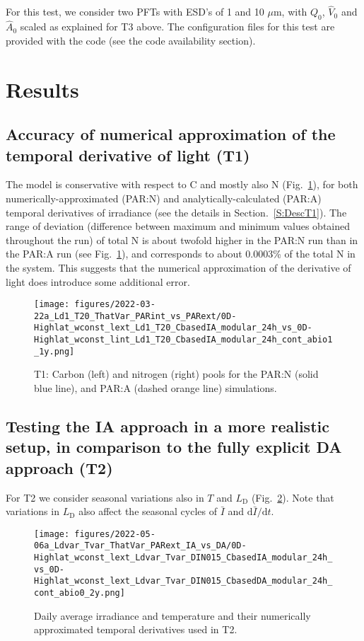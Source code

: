 \documentclass[gmd, manuscript]{copernicus}
\begin{document}
    For this test, we consider two PFTs with ESD's of 1 and 10 $\mu$m, with $Q_0$, $\hat{V}_0$ and $\hat{A}_0$ scaled as explained for T3 above. The configuration files for this test are provided with the code (see the code availability section).

\section{Results}

\subsection{Accuracy of numerical approximation of the temporal derivative of light (T1)}
The model is conservative with respect to C and mostly also N (Fig.~\ref{f.T1res}), for both numerically-approximated (PAR:N) and analytically-calculated (PAR:A) temporal derivatives of irradiance (see the details in Section.~\ref{S:DescT1}). The range of deviation (difference between maximum and minimum values obtained throughout the run) of total N is about twofold higher in the PAR:N run than in the PAR:A run (see Fig.~\ref{f.T1res}), and corresponds to about 0.0003\% of the total N in the system. This suggests that the numerical approximation of the derivative of light does introduce some additional error.

\begin{figure}[ht!]
\texttt{[image: figures/2022-03-22a\_Ld1\_T20\_ThatVar\_PARint\_vs\_PARext/0D-Highlat\_wconst\_lext\_Ld1\_T20\_CbasedIA\_modular\_24h\_vs\_0D-Highlat\_wconst\_lint\_Ld1\_T20\_CbasedIA\_modular\_24h\_cont\_abio1\_1y.png]}
\caption{T1: Carbon (left) and nitrogen (right) pools for the PAR:N (solid blue line), and PAR:A (dashed orange line) simulations.
\label{f.T1res}}
\end{figure}

\FloatBarrier%

\subsection{Testing the IA approach in a more realistic setup, in comparison to the fully explicit DA approach (T2)}

For T2 we consider seasonal variations also in $T$ and $L_{\text{D}}$ (Fig.~\ref{f.T2env}).  Note that variations in $L_{\text{D}}$ also affect the seasonal cycles of $\bar{I}$ and $\text{d}\bar{I}/\text{d}t$.

\begin{figure}[ht!]
  \texttt{[image: figures/2022-05-06a\_Ldvar\_Tvar\_ThatVar\_PARext\_IA\_vs\_DA/0D-Highlat\_wconst\_lext\_Ldvar\_Tvar\_DIN015\_CbasedIA\_modular\_24h\_vs\_0D-Highlat\_wconst\_lext\_Ldvar\_Tvar\_DIN015\_CbasedDA\_modular\_24h\_cont\_abio0\_2y.png]}
  \caption{Daily average irradiance and temperature and their numerically approximated temporal derivatives used in T2.\label{f.T2env}}
\end{figure}
\end{document}
